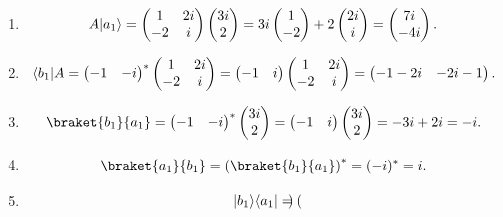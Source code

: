 \documentclass[11pt, letterpaper]{article}
\begin{document}
\begin{enumerate}
\[		.\]
	\item 
		\[
			A \lvert a_1\rangle =\begin{pmatrix}
			1 & 2i \\
			-2 & i
			\end{pmatrix}\begin{pmatrix}
			3i \\
			2
			\end{pmatrix}=3i\begin{pmatrix}
			1 \\
			-2
			\end{pmatrix}+2 \begin{pmatrix}
			2i \\
			i
			\end{pmatrix}=\begin{pmatrix}
			7i \\
			-4i
			\end{pmatrix}
		.\]
	\item 
		\[
			\langle b_1\rvert A = \begin{pmatrix}
			-1 & -i
			\end{pmatrix}^* \begin{pmatrix}
			1 & 2i \\
			-2 & i
			\end{pmatrix} = \begin{pmatrix}
			-1 & i
			\end{pmatrix} \begin{pmatrix}
			1 & 2i \\
			-2 & i
			\end{pmatrix}=\begin{pmatrix}
			-1-2i & -2i-1
			\end{pmatrix}
		.\]
	\item 
		\[
			\braket{b_1}{a_1} =\begin{pmatrix}
			-1 & -i
			\end{pmatrix}^* \begin{pmatrix}
			3i \\
			2
			\end{pmatrix}=\begin{pmatrix}
			-1 & i
			\end{pmatrix}\begin{pmatrix}
			3i \\
			2
			\end{pmatrix}=-3i+2i=-i
		.\]
	\item
		\[
			\braket{a_1}{b_1} =\left( \braket{b_1}{a_1}  \right)^* = (-i)^*=i
		.\]
	\item 
		\[
			\lvert b_1\rangle \langle a_1\rvert = \begin{pmatrix}

\end{pmatrix}\]
\end{enumerate}
\end{document}
